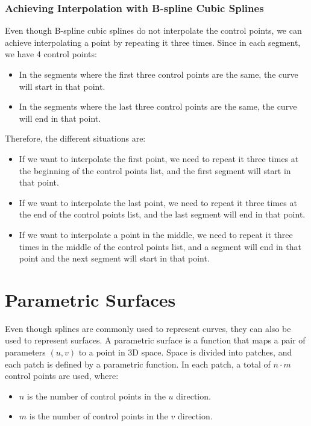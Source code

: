 \subsubsection{Achieving Interpolation with B-spline Cubic Splines}

Even though B-spline cubic splines do not interpolate the control points, we can achieve interpolating a point by repeating it three times.
Since in each segment, we have 4 control points:
\begin{itemize}
    \item In the segments where the first three control points are the same, the curve will start in that point.
    \item In the segments where the last three control points are the same, the curve will end in that point.
\end{itemize}

Therefore, the different situations are:
\begin{itemize}
    \item If we want to interpolate the first point, we need to repeat it three times at the beginning of the control points list, and the first segment will start in that point.
    \item If we want to interpolate the last point, we need to repeat it three times at the end of the control points list, and the last segment will end in that point.
    \item If we want to interpolate a point in the middle, we need to repeat it three times in the middle of the control points list, and a segment will end in that point and the next segment will start in that point.
\end{itemize}


\section{Parametric Surfaces}

Even though splines are commonly used to represent curves, they can also be used to represent surfaces. A parametric surface is a function that maps a pair of parameters $(u,v)$ to a point in 3D space. Space is divided into patches, and each patch is defined by a parametric function. In each patch, a total of $n\cdot m$ control points are used, where:
\begin{itemize}
    \item $n$ is the number of control points in the $u$ direction.
    \item $m$ is the number of control points in the $v$ direction.
\end{itemize}

